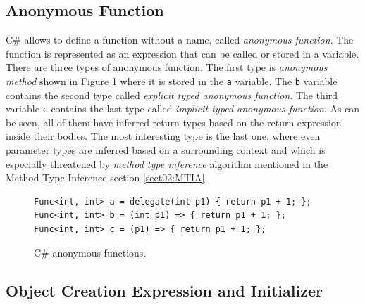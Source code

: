 \subsection*{Anonymous Function}

C\# allows to define a function without a name, called \textit{anonymous function}.
The function is represented as an expression that can be called or stored in a variable.
There are three types of anonymous function.
The first type is \textit{anonymous method} shown in Figure \ref{img06:anonymousF} where it is stored in the \texttt{a} variable.
The \texttt{b} variable contains the second type called \textit{explicit typed anonymous function}.
The third variable \texttt{c} contains the last type called \textit{implicit typed anonymous function}.
As can be seen, all of them have inferred return types based on the return expression inside their bodies.
The most interesting type is the last one, where even parameter types are inferred based on a surrounding context and which is especially threatened by \textit{method type inference} algorithm mentioned in the Method Type Inference section \ref{sect02:MTIA}.
\begin{figure}[h]
\begin{lstlisting}[style=csharp]
Func<int, int> a = delegate(int p1) { return p1 + 1; };
Func<int, int> b = (int p1) => { return p1 + 1; };
Func<int, int> c = (p1) => { return p1 + 1; };
\end{lstlisting}
\caption{C\# anonymous functions.}
\label{img06:anonymousF}
\end{figure}

\subsection*{Object Creation Expression and Initializer}

